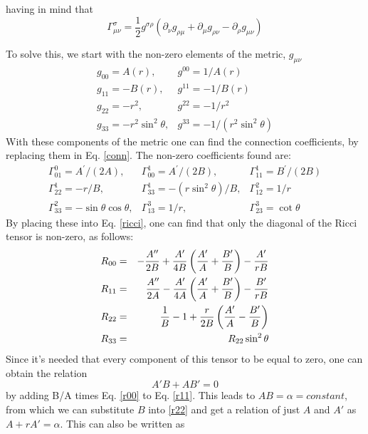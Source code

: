 \documentclass[letterpaper,11pt,onecolumn]{article}
\begin{document}
having in mind that
\begin{equation}
\Gamma_{\mu \nu}^{\sigma}=\frac{1}{2} g^{\sigma \rho}\left(\partial_{\nu} g_{\rho \mu}+\partial_{\mu} g_{\rho \nu}-\partial_{\rho} g_{\mu \nu}\right)
\label{conn}
\end{equation}

To solve this, we start with the non-zero elements of the metric, $g_{\mu\nu}$
  $$
\begin{array}{ll}
g_{00}=A(r), & g^{00}=1 / A(r) \\
g_{11}=-B(r), & g^{11}=-1 / B(r) \\
g_{22}=-r^{2}, & g^{22}=-1 / r^{2} \\
g_{33}=-r^{2} \sin ^{2} \theta, & g^{33}=-1 /\left(r^{2} \sin ^{2} \theta\right)
\end{array}
$$
With these components of the metric one can find the connection coefficients, by replacing them in Eq. \ref{conn}. The non-zero coefficients found are: 
$$
\begin{array}{lll}
\Gamma_{01}^{0}=A^{\prime} /(2 A), & \Gamma_{00}^{1}=A^{\prime} /(2 B), & \Gamma_{11}^{1}=B^{\prime} /(2 B) \\
\Gamma_{22}^{1}=-r / B, & \Gamma_{33}^{1}=-\left(r \sin ^{2} \theta\right) / B, & \Gamma_{12}^{2}=1 / r \\
\Gamma_{33}^{2}=-\sin \theta \cos \theta, & \Gamma_{13}^{3}=1 / r, & \Gamma_{23}^{3}=\cot \theta
\end{array}
$$
By placing these into Eq. \ref{ricci}, one can find that only the diagonal of the Ricci tensor is non-zero, as follows:
\begin{eqnarray}
\centering
R_{00}&=&-\frac{A^{\prime \prime}}{2 B}+\frac{A^{\prime}}{4 B}\left(\frac{A^{\prime}}{A}+\frac{B^{\prime}}{B}\right)-\frac{A^{\prime}}{r B} \label{r00}\\
R_{11}&=&\frac{A^{\prime \prime}}{2 A}-\frac{A^{\prime}}{4 A}\left(\frac{A^{\prime}}{A}+\frac{B^{\prime}}{B}\right)-\frac{B^{\prime}}{r B} \label{r11}\\
R_{22}&=&\frac{1}{B}-1+\frac{r}{2 B}\left(\frac{A^{\prime}}{A}-\frac{B^{\prime}}{B}\right)\label{r22} \\
R_{33}&=&R_{22} \sin ^{2} \theta\label{r33}
\end{eqnarray}
 Since it's needed that every component of this tensor to be equal to zero, one can obtain the relation
 \begin{equation}
     A'B+AB'=0\nonumber
 \end{equation}
 by adding B/A times Eq. \ref{r00} to Eq. \ref{r11}. This leads to $AB=\alpha=constant$, from which we can substitute $B$ into \ref{r22} and get a relation of just $A$ and $A'$ as $A+rA'=\alpha$. This can also be written as
\end{document}
